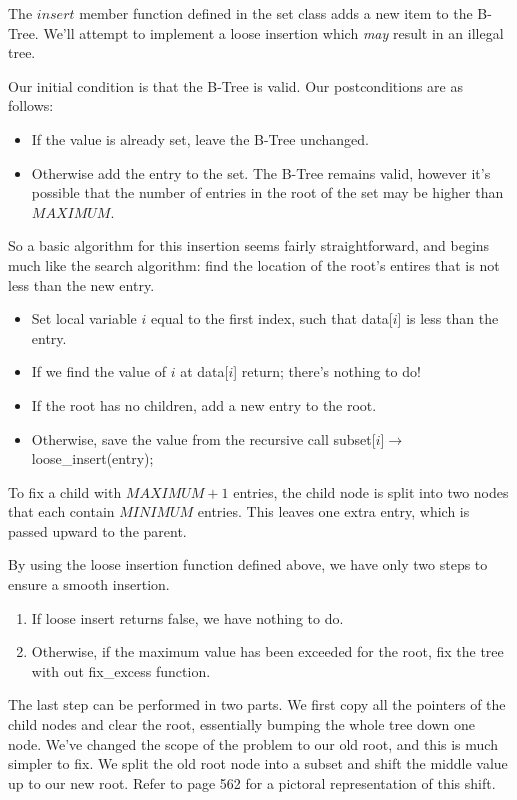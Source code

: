 The $insert$ member function defined in the set class adds a new item to the B-Tree. We'll attempt to implement a loose insertion which \emph{may} result in an illegal tree.

Our initial condition is that the B-Tree is valid. Our postconditions are as follows:
\begin{itemize}
\item If the value is already set, leave the B-Tree unchanged.
\item Otherwise add the entry to the set. The B-Tree remains valid, however it's possible that the number of entries in the root of the set may be higher than $MAXIMUM$.
\end{itemize}
So a basic algorithm for this insertion seems fairly straightforward, and begins much like the search algorithm: find the location of the root's entires that is not less than the new entry.
\begin{itemize}
\item Set local variable $i$ equal to the first index, such that data[$i$] is less than the entry.
\item If we find the value of $i$ at data[$i$] return; there's nothing to do!
\item If the root has no children, add a new entry to the root.
\item Otherwise, save the value from the recursive call subset[$i$]$\to$loose\_insert(entry); 
\end{itemize}

To fix a child with $MAXIMUM+1$ entries, the child node is split into two nodes that each contain $MINIMUM$ entries. This leaves one extra entry, which is passed upward to the parent.

By using the loose insertion function defined above, we have only two steps to ensure a smooth insertion.
\begin{enumerate}
\item If loose insert returns false, we have nothing to do.
\item Otherwise, if the maximum value has been exceeded for the root, fix the tree with out fix\_excess function.
\end{enumerate}
The last step can be performed in two parts. We first copy all the pointers of the child nodes and clear the root, essentially bumping the whole tree down one node. We've changed the scope of the problem to our old root, and this is much simpler to fix. We split the old root node into a subset and shift the middle value up to our new root. Refer to page 562 for a pictoral representation of this shift.

